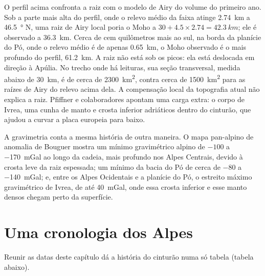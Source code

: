 O perfil acima confronta a raiz com o modelo de Airy do volume do primeiro
ano. Sob a parte mais alta do perfil, onde o relevo médio da faixa atinge
\qty{2.74}{km} a \qty{46.5}{\degree} N, uma raiz de Airy local poria o Moho a
$30 + 4.5 \times 2.74 = \qty{42.3}{km}$; ele é observado a \qty{36.3}{km}. Cerca de cem
quilômetros mais ao sul, na borda da planície do Pó, onde o relevo médio é de apenas
\qty{0.65}{km}, o Moho observado é o mais profundo do perfil, \qty{61.2}{km}. A raiz não está sob os picos: ela está
deslocada em direção à Apúlia. No trecho onde há leituras, sua seção transversal, medida
abaixo de \qty{30}{km}, é de cerca de \qty{2300}{km^2}, contra cerca de \qty{1500}{km^2} para as raízes de
Airy do relevo acima dela. A compensação local da topografia atual não
explica a raiz. Pfiffner e colaboradores apontam uma carga extra: o corpo de Ivrea, uma cunha de
manto e crosta inferior adriáticos dentro do cinturão, que ajudou a curvar a placa europeia
para baixo.

A gravimetria conta a mesma história de outra maneira. O mapa pan-alpino de anomalia de Bouguer mostra um
mínimo gravimétrico alpino de $-100$ a \qty{-170}{mGal} ao longo da cadeia, mais profundo nos Alpes
Centrais, devido à crosta leve da raiz espessada; um mínimo da bacia do Pó de cerca de $-80$ a
\qty{-140}{mGal}; e, entre os Alpes Ocidentais e a planície do Pó, o estreito máximo gravimétrico de
Ivrea, de até \qty{+40}{mGal}, onde essa crosta inferior e esse manto densos chegam perto da
superfície.

\section{Uma cronologia dos Alpes}\label{sec:b2:alpine-orogen:timeline}

Reunir as datas deste capítulo dá a história do cinturão numa só tabela
(tabela abaixo).

